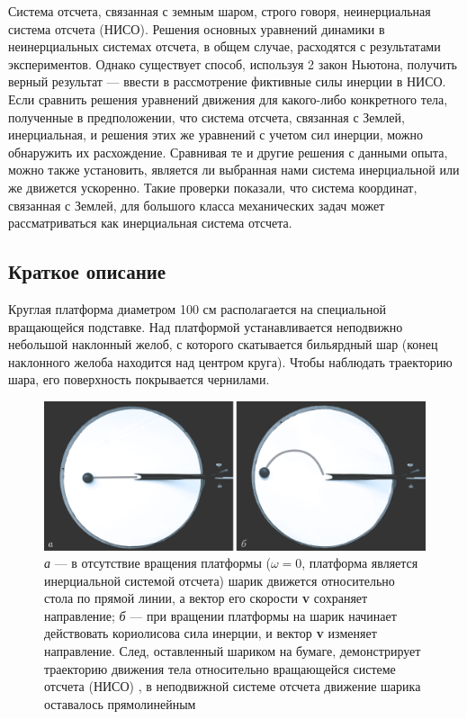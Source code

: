 \documentclass[All.tex]{subfiles}
\begin{document}
		Система отсчета, связанная с земным шаром, строго говоря, неинерциальная система отсчета (НИСО).
		Решения основных уравнений динамики в неинерциальных системах отсчета, в общем случае, расходятся с результатами экспериментов. Однако существует способ, используя 2 закон Ньютона, получить верный результат — ввести в рассмотрение фиктивные силы инерции в НИСО. Если сравнить решения уравнений движения для какого-либо конкретного тела, полученные в предположении, что система отсчета, связанная с Землей, инерциальная, и решения этих же уравнений с учетом сил инерции, можно обнаружить их расхождение.
		Сравнивая те и другие решения с данными опыта, можно также установить, является ли выбранная нами система инерциальной или же движется ускоренно.
		Такие проверки показали, что система координат, связанная с Землей, для большого класса механических задач может рассматриваться как инерциальная система отсчета.	
	
	
	\subsection*{\textcolor{PineGreen}{Краткое описание}}
	
Круглая платформа диаметром 100 см располагается на специальной вращающейся подставке. 
Над платформой устанавливается неподвижно небольшой наклонный желоб, с которого 
скатывается бильярдный шар (конец наклонного желоба находится над центром круга). 
Чтобы наблюдать траекторию шара, его поверхность покрывается чернилами.

\begin{figure}[H] 	
	\centering 	
	\includegraphics[width=0.9\linewidth]{Coriolis-2.png}
	\caption{\textit{а} — в отсутствие вращения платформы ($ \omega=0 $, платформа является инерциальной системой отсчета) шарик движется относительно стола по прямой линии, а вектор его скорости \textbf{v} сохраняет направление; \textit{б} — при вращении платформы на шарик начинает действовать кориолисова сила инерции, и вектор \textbf{v} изменяет направление. След, оставленный шариком на бумаге, демонстрирует траекторию движения тела относительно вращающейся системе отсчета (НИСО) , в неподвижной системе отсчета движение шарика оставалось прямолинейным}
	\label{Coriolis-2}
\end{figure}
\end{document}
